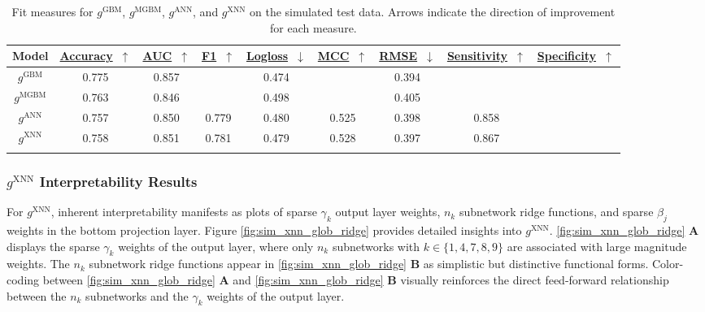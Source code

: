 \documentclass[information,article,submit,moreauthors,pdftex]{definitions/mdpi}
\begin{document}
\begin{table}[H]
	\caption{Fit measures for $g^\text{GBM}$, $g^\text{MGBM}$, $g^\text{ANN}$, and $g^\text{XNN}$ on the simulated test data. Arrows indicate the direction of improvement for each measure.}
	\centering
	\begin{tabular}{ccccccccc}
		\toprule
		\textbf{Model} & 
		\href{https://scikit-learn.org/stable/modules/model_evaluation.html#accuracy-score}{\textbf{Accuracy}}~$\uparrow$ & \href{https://en.wikipedia.org/wiki/Receiver_operating_characteristic#Area_under_the_curve}{\textbf{AUC}}~$\uparrow$ & \href{https://en.wikipedia.org/wiki/F1_score}{\textbf{F1}}~$\uparrow$ & 
		\href{https://scikit-learn.org/stable/modules/model_evaluation.html#log-loss}{\textbf{Logloss}}~$\downarrow$ & \href{https://en.wikipedia.org/wiki/Matthews_correlation_coefficient}{\textbf{MCC}}~$\uparrow$ & \href{https://en.wikipedia.org/wiki/Root-mean-square_deviation}{\textbf{RMSE}}~$\downarrow$ & \href{https://en.wikipedia.org/wiki/Sensitivity_and_specificity}{\textbf{Sensitivity}}~$\uparrow$ & \href{https://en.wikipedia.org/wiki/Sensitivity_and_specificity}{\textbf{Specificity}}~$\uparrow$ \\
		\midrule
		$g^\text{GBM}$		& 0.775	& 0.857	& & 0.474 &	& 0.394 & & \\
		$g^\text{MGBM}$		& 0.763	& 0.846	& & 0.498 &	& 0.405 & & \\
		$g^\text{ANN}$		& 0.757	& 0.850	& 0.779 & 0.480 &	0.525 & 0.398 & 0.858 & \\
		$g^\text{XNN}$		& 0.758	& 0.851	& 0.781 & 0.479 &	0.528 & 0.397 & 0.867 & \\
		\bottomrule
		\label{tab:sim_acc}
	\end{tabular}
\end{table}

\subsubsection{$g^\text{XNN}$ Interpretability Results}\label{ssec:xnn_sim}

For $g^\text{XNN}$, inherent interpretability manifests as plots of sparse $\gamma_k$ output layer weights, $n_k$ subnetwork ridge functions, and sparse $\beta_j$ weights in the bottom projection layer. Figure \ref{fig:sim_xnn_glob_ridge} provides detailed insights into $g^\text{XNN}$. \ref{fig:sim_xnn_glob_ridge} \textbf{A} displays the sparse $\gamma_k$ weights of the output layer, where only $n_k$ subnetworks with $k \in \{1, 4, 7, 8, 9\}$ are associated with large magnitude weights. The $n_k$ subnetwork ridge functions appear in \ref{fig:sim_xnn_glob_ridge} \textbf{B} as simplistic but distinctive functional forms. Color-coding between \ref{fig:sim_xnn_glob_ridge} \textbf{A} and \ref{fig:sim_xnn_glob_ridge} \textbf{B} visually reinforces the direct feed-forward relationship between the $n_k$ subnetworks and the $\gamma_k$ weights of the output layer.
\end{document}
